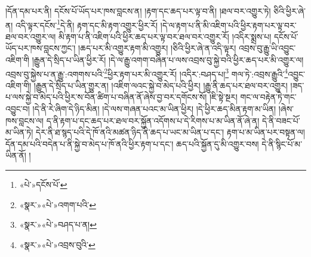 །དོན་དམ་པར་ནི། དངོས་པོ་ཡོད་པར་ཁས་བླངས་ན། །རྟག་དང་ཆད་པར་ལྟ་བ་ནི། །ཐལ་བར་འགྱུར་ཏེ། ཅིའི་ཕྱིར་ཞེ་ན། འདི་ལྟར་དངོས་\footnote{«པེ་»དངོས་པོ་}དེ་ནི། རྟག་དང་མི་རྟག་འགྱུར་ཕྱིར་རོ། །དེ་ལ་རྟག་པ་ནི་མི་འཇིག་པའི་ཕྱིར་རྟག་པར་ལྟ་བར་ཐལ་བར་འགྱུར་ལ། མི་རྟག་པ་ནི་འཇིག་པའི་ཕྱིར་ཆད་པར་ལྟ་བར་ཐལ་བར་འགྱུར་རོ། །འདིར་སྨྲས་པ། དངོས་པོ་ཡོད་པར་ཁས་བླངས་ཀྱང་། །ཆད་པར་མི་འགྱུར་རྟག་མི་འགྱུར། །ཅིའི་ཕྱིར་ཞེ་ན་འདི་ལྟར། འབྲས་བུ་རྒྱུ་ཡི་འབྱུང་འཇིག་གི །རྒྱུན་དེ་སྲིད་པ་ཡིན་ཕྱིར་རོ། །དེ་ལ་རྒྱུ་འགག་བཞིན་པ་ལས་འབྲས་བུ་སྐྱེ་བའི་ཕྱིར་ཆད་པར་མི་འགྱུར་ལ། འབྲས་བུ་སྐྱེས་པ་ན་རྒྱུ་:འགགས་པའི་\footnote{«སྣར་»«པེ་»འགག་པའི་}ཕྱིར་རྟག་པར་མི་འགྱུར་རོ། །འདིར་:བཤད་པ།\footnote{«སྣར་»«པེ་»བཤད་པ་ན།} གལ་ཏེ་:འབྲས་རྒྱུའི་\footnote{«སྣར་»«པེ་»འབྲས་བུའི་}འབྱུང་འཇིག་གི། །རྒྱུན་དེ་སྲིད་པ་ཡིན་གྱུར་ན། །འཇིག་ལའང་སྐྱེ་བ་མེད་པའི་ཕྱིར། །རྒྱུ་ནི་ཆད་པར་ཐལ་བར་འགྱུར། །ཟད་པ་ལས་སྐྱེ་བ་མེད་པའི་ཕྱིར་ས་བོན་ཚིག་པ་བཞིན་ནོ་ཞེས་བྱ་བར་དགོངས་སོ། །ཇི་སྟེ་སྔར། གང་ལ་བརྟེན་ཏེ་གང་འབྱུང་བ། །དེ་ནི་རེ་ཞིག་དེ་ཉིད་མིན། །དེ་ལས་གཞན་པའང་མ་ཡིན་ཕྱིར། །དེ་ཕྱིར་ཆད་མིན་རྟག་མ་ཡིན། །ཞེས་ཁས་བླངས་ལ། ད་ནི་རྟག་པ་དང་ཆད་པར་ཐལ་བར་སྐྱོན་འདོགས་པ་དེ་རིགས་པ་མ་ཡིན་ནོ་ཞེ་ན། དེ་ནི་བཟང་པོ་མ་ཡིན་ཏེ། དེར་ནི་ཐ་སྙད་པའི་དེ་ཁོ་ནའི་མཚན་ཉིད་ནི་ཆད་པ་ཡང་མ་ཡིན་པ་དང་། རྟག་པ་མ་ཡིན་པར་བསྟན་ལ། དོན་དམ་པའི་བདེན་པ་ནི་སྐྱེ་བ་མེད་པ་ཁོ་ནའི་ཕྱིར་རྟག་པ་དང་། ཆད་པའི་སྐྱོན་དུ་མི་འགྱུར་བས། དེ་ནི་སྙིང་པོ་མ་ཡིན་ནོ། །
